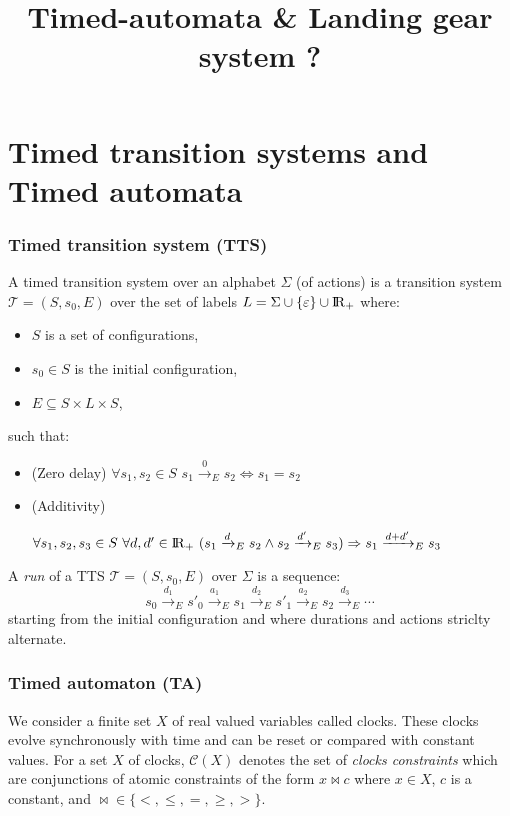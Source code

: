 \documentclass[a4paper,10pt]{article}
\title{Timed-automata \& Landing gear system ?}
\def\C{\ensuremath{\mathcal{C}}}
\def\T{\ensuremath{\mathcal{T}}}
\def\bbbr{{\rm I\!R }}
\begin{document}
\maketitle

\section{Timed transition systems and Timed automata}


\subsubsection*{Timed transition system (TTS)}

A timed transition system over an alphabet $\Sigma$ (of actions) is a
transition system $\T=(S,s_0,E)$ over the set of labels $L = \Sigma
\cup \{ \varepsilon \} \cup \bbbr_{+}$ where:
\begin{itemize}
\item $S$ is a set of configurations,
\item $s_0 \in S$ is the initial configuration,
\item $E \subseteq S \times L \times S$,
\end{itemize}
such that:
\begin{itemize}
\item (Zero delay) $\forall s_1,s_2 \in S \, \, s_1 \xrightarrow{0}_{E} s_2
  \Leftrightarrow s_1=s_2$
\item (Additivity) 

$\forall s_1, s_2 ,s_3 \in S \, \, \forall d,d' \in
  \bbbr_{+} \, \, (s_1 \xrightarrow{d}_E s_2 \land s_2 \xrightarrow{d'}_E
  s_3) \Rightarrow s_1 \xrightarrow{d+d'}_E s_3$
\end{itemize}


A \emph{run} of a TTS $\T=(S,s_0,E)$ over $\Sigma$ is a sequence:
\[
s_0 \xrightarrow{d_1}_E s'_0 \xrightarrow{a_1}_E s_1
\xrightarrow{d_2}_E s'_1 \xrightarrow{a_2}_E s_2 \xrightarrow{d_3}_E \cdots
\]
starting from the initial configuration and where durations and
actions striclty alternate.


\subsubsection*{Timed automaton (TA)}

We consider a finite set $X$  of real valued variables called
clocks. These clocks evolve synchronously with time and can be reset
or compared with constant values.
For a set $X$ of clocks, $\C(X)$ denotes the set of \emph{clocks constraints}
which are conjunctions of atomic constraints of the form $x \bowtie c$
where $x \in X$, $c$ is a constant, and $\bowtie \in \{ <,\le,= , \geq,>
\}$.
\end{document}
